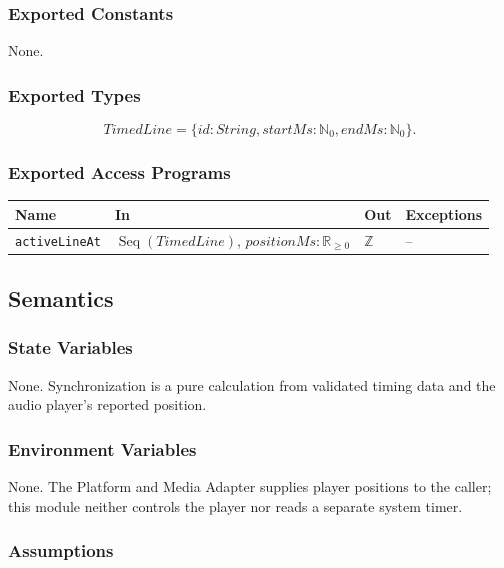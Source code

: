 \documentclass[12pt, titlepage]{article}
\begin{document}
\subsubsection{Exported Constants}

None.

\subsubsection{Exported Types}

\[
\textit{TimedLine}=\{id:String,startMs:\mathbb{N}_0,endMs:\mathbb{N}_0\}.
\]

\subsubsection{Exported Access Programs}

\begin{center}
\small
\begin{tabularx}{\textwidth}{p{2.8cm} X X p{2.2cm}}
\toprule
\textbf{Name} & \textbf{In} & \textbf{Out} & \textbf{Exceptions} \\
\midrule
\texttt{activeLineAt} & $\operatorname{Seq}(TimedLine)$,
$positionMs: \mathbb{R}_{\geq 0}$ & $\mathbb{Z}$ & -- \\
\bottomrule
\end{tabularx}
\normalsize
\end{center}

\subsection{Semantics}

\subsubsection{State Variables}

None.  Synchronization is a pure calculation from validated timing data and
the audio player's reported position.

\subsubsection{Environment Variables}

None.  The Platform and Media Adapter supplies player positions to the caller;
this module neither controls the player nor reads a separate system timer.

\subsubsection{Assumptions}
\end{document}
